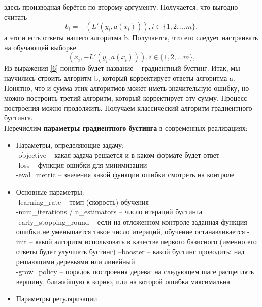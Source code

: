 здесь производная берётся по второму аргументу. Получается, что выгодно считать
\begin{equation}\label{5}
    b_i = -(L'(y_i, a(x_i))), i \in \{1,2,...m\},
\end{equation}
а это и есть ответы нашего алгоритма b. Получается, что его следует настраивать на обучающей выборке 
\begin{equation}\label{6}
   (x_i, -L'(y_i, a(x_i))), i \in \{1,2,...m\},
\end{equation}
Из выражения \ref{6} понятно будет название – градиентный бустинг. 
Итак, мы научились строить алгоритм b, который корректирует ответы алгоритма a. Понятно, что и сумма этих алгоритмов может иметь значительную ошибку, но можно построить третий алгоритм, который корректирует эту сумму. Процесс построения можно продолжить. Получаем классический алгоритм градиентного бустинга. \\


Перечислим \textbf{параметры градиентного бустинга} в современных реализациях:
\begin{itemize}
    \item Параметры, определяющие задачу: \\
        -objective – какая задача решается и в каком формате будет ответ \\
        -loss – функция ошибки для минимизации \\
        -eval\_metric – значения какой функции ошибки смотреть на контроле 
    \item Основные параметры: \\
    -learning\_rate – темп (скорость) обучения \\
    -num\_iterations / n\_estimators  – число итераций бустинга \\
    -early\_stopping\_round  –  если на отложенном контроле заданная функция ошибки не уменьшается такое число итераций, обучение останавливается
    -init – какой алгоритм использовать в качестве первого базисного (именно его ответы будет улучшать бустинг)
    --booster – какой бустинг проводить: над решающими деревьями или линейный \\
    -grow\_policy – порядок построения дерева: на следующем шаге расщеплять вершину, ближайшую к корню, или на которой ошибка максимальна
    \item Параметры регуляризации


\end{itemize}


